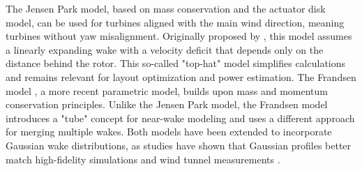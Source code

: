 \begin{table}[ht]
    \begin{center}
        \caption{Overview of wind farm models and simulation tools. Models and software marked in bold are used in this thesis.}
        \label{tab:WFModels}
    \end{center}
\end{table}
%
The Jensen Park model, based on mass conservation and the actuator disk model, can be used for turbines aligned with the main wind direction, meaning turbines without yaw misalignment. Originally proposed by \cite{jensen1983note}, this model assumes a linearly expanding wake with a velocity deficit that depends only on the distance behind the rotor. This so-called "top-hat" model simplifies calculations and remains relevant for layout optimization and power estimation. 
%
The Frandsen model \cite{frandsen2006analytical}, a more recent parametric model, builds upon mass and momentum conservation principles. Unlike the Jensen Park model, the Frandsen model introduces a "tube" concept for near-wake modeling and uses a different approach for merging multiple wakes. Both models have been extended to incorporate Gaussian wake distributions, as studies have shown that Gaussian profiles better match high-fidelity simulations \cite{sizhuang2014analysis} and wind tunnel measurements \cite{bastankhah2014new}.
